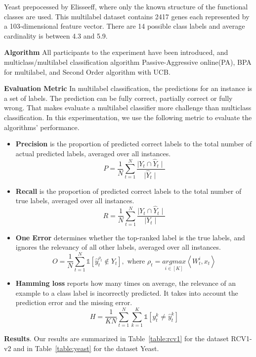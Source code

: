 Yeast prepocessed by Elisseeff\cite{elisseeff2001kernel}, where only the known structure of the functional classes are used. This multilabel dataset contains 2417 genes each represented by a 103-dimensional feature vector. There are 14 possible class labels and average cardinality is between 4.3 and 5.9.

\textbf{Algorithm} All participants to the experiment have been introduced, and multiclass/multilabel classification algorithm Passive-Aggressive online(PA), BPA for multilabel, and Second Order algorithm with UCB.

\textbf{Evaluation Metric} In multilabel classification, the predictions for an instance is a set of labels. The prediction can be fully correct, partially correct or fully wrong. That makes evaluate a multilabel classifier more challenge than multiclass classification. In this experimentation, we use the following metric to evaluate the algorithms' performance. 

\begin{itemize}
\item	\textbf{Precision} is the proportion of predicted correct labels to the total number of actual predicted labels, averaged over all instances.
\[P = \frac{1}{N}\sum_{t=1}^{N}\frac{\mid Y_t\cap \hat{Y}_t\mid}{\mid\hat{Y}_t\mid}\]

\item	\textbf{Recall} is the proportion of predicted correct labels to the total number of true labels, averaged over all instances. 
\[R = \frac{1}{N} \sum_{t=1}^{N}\frac{\mid Y_t \cap \hat{Y}_t\mid}{\mid Y_t \mid}\]

\item	\textbf{One Error} determines whether the top-ranked label is the true labels, and ignores the relevancy of all other labels, averaged over all instances.
\[O = \frac{1}{N}\sum_{t=1}^{N}\mathds{1}{[\hat{y}_t^{\rho_t} \notin Y_t]}, \text{ where } \rho_t = \underset{i\in[K]}{argmax}\left\langle W_t^i , x_t\right\rangle\]

\item	\textbf{Hamming loss} reports how many times on average, the relevance of an example to a class label is incorrectly predicted. It takes into account the prediction error and the missing error.
\[H = \frac{1}{KN}\sum_{t=1}^{N}\sum_{k=1}^{K}\mathds{1}{[y_t^k\neq \hat{y}_t^k]}\]
\end{itemize}

\textbf{Results}. Our results are summarized in Table~\ref{table:rcv1} for the dataset RCV1-v2 and in Table~\ref{table:yeast} for the dataset Yeast.


